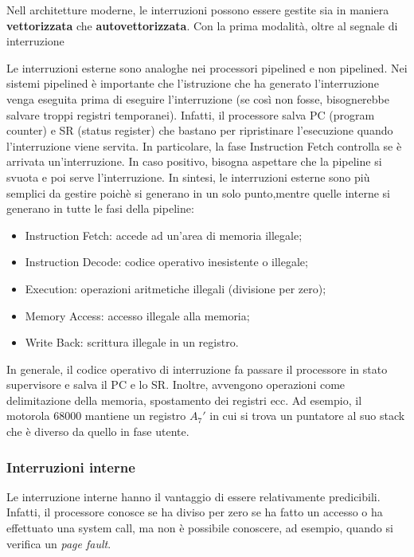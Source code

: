 \documentclass{article}
\begin{document}
Nell architetture moderne, le interruzioni possono essere gestite sia in maniera
\textbf{vettorizzata} che \textbf{autovettorizzata}. Con la prima modalità, 
oltre al segnale di interruzione 

Le interruzioni esterne sono analoghe nei processori pipelined e non pipelined. 
Nei sistemi pipelined è importante che l'istruzione che ha generato 
l'interruzione venga eseguita prima di eseguire l'interruzione
(se così non fosse, bisognerebbe 
salvare troppi registri temporanei). Infatti, il processore salva PC
(program counter) e SR (status register) che bastano per ripristinare
l'esecuzione quando l'interruzione viene servita. In particolare,
la fase Instruction Fetch controlla se è arrivata un'interruzione. 
In caso positivo, bisogna aspettare che la pipeline si svuota e poi serve
l'interruzione. In sintesi, le interruzioni esterne sono più semplici da
gestire poichè si generano in un solo punto,mentre quelle interne si generano
in tutte le fasi della pipeline:

\begin{itemize}
  \item Instruction Fetch: accede ad un'area di memoria illegale;
  \item Instruction Decode: codice operativo inesistente o illegale;
  \item Execution: operazioni aritmetiche illegali (divisione per zero);
  \item Memory Access: accesso illegale alla memoria;
  \item Write Back: scrittura illegale in un registro.
\end{itemize}


In generale, il codice operativo di interruzione fa passare il processore in 
stato supervisore e salva il PC e lo SR. Inoltre, avvengono operazioni come 
delimitazione della memoria, spostamento dei registri ecc. Ad esempio, il 
motorola 68000 mantiene un registro $A_7'$ in cui si trova un puntatore al suo
stack che è diverso da quello in fase utente.

\subsubsection{Interruzioni interne}
Le interruzione interne hanno il vantaggio di essere relativamente predicibili.
Infatti, il processore conosce se ha diviso per zero se ha fatto un accesso o
ha effettuato una system call, ma non è possibile conoscere, ad esempio, quando
si verifica un \textit{page fault}.\\
\end{document}
